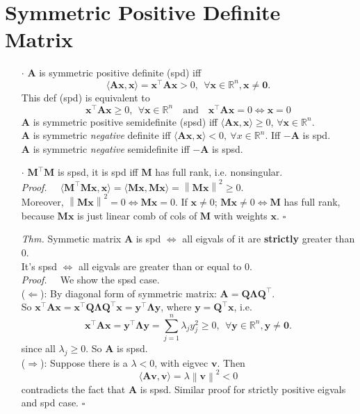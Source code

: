 \documentclass[a4paper, 11pt]{article}
\begin{document}
\section{Symmetric Positive Definite Matrix}
\begin{itemize}
	\item[$\cdot$] $\bm{A}$ is symmetric positive definite (spd) iff
	$$
	\langle \bm{Ax}, \bm{x} \rangle = \bm{x}^{\top} \bm{A}\bm{x} > 0,~~\forall \bm{x} \in \mathbb{R}^n, \bm{x}\ne \bm{0}.
	$$
	This def (spd) is equivalent to
	$$
	\bm{x}^{\top} \bm{Ax} \geq 0,~~\forall \bm{x}\in \mathbb{R}^n\text{~~~and~~~} \bm{x}^{\top} \bm{Ax} = 0 \iff \bm{x}=0
	$$
	$\bm{A}$ is symmetric positive semidefinite (spsd) iff $\langle \bm{Ax}, \bm{x} \rangle\geq 0$, $\forall \bm{x}\in \mathbb{R}^n$. \\
	$\bm{A}$ is symmetric \textit{negative} definite iff $\langle \bm{Ax},\bm{x} \rangle<0,~\forall x\in \mathbb{R}^n$. Iff $-\bm{A}$ is spd. \\
	$\bm{A}$ is symmetric \textit{negative} semidefinite iff $-\bm{A}$ is spsd.

	\item[$\cdot$] $\bm{M}^{\top} \bm{M}$ is spsd, it is spd iff $\bm{M}$ has full rank, i.e. nonsingular.\\
	\textit{Proof.~~} $\langle \bm{M}^{\top} \bm{Mx}, \bm{x} \rangle = \langle \bm{Mx}, \bm{Mx} \rangle = \left\|\bm{Mx}\right\|^2 \geq 0$.\\
	Moreover, $\left\|\bm{Mx}\right\|^2 = 0 \iff \bm{Mx}=0$. If $\bm{x}\ne 0$; $\bm{Mx}\ne 0 \iff \bm{M}$ has full rank, because $\bm{Mx}$ is just linear comb of cols of $\bm{M}$ with weights $\bm{x}$. $\square$
	\item[\textit{Thm.}] Symmetic matrix $\bm{A}$ is spd $\iff$ all eigvals of it are \textbf{strictly} greater than 0. \\
	It's spsd $\iff$ all eigvals are greater than or equal to 0. \\
	\textit{Proof.~~} We show the spsd case. \\
	($\Leftarrow$): By diagonal form of symmetric matrix: $\bm{A}=\bm{Q} \bm{\Lambda} \bm{Q}^{\top} $. \\
	So $\bm{x}^{\top} \bm{Ax} = \bm{x}^{\top}\bm{Q} \bm{\Lambda} \bm{Q}^{\top} \bm{x} = \bm{y}^{\top} \bm{\Lambda}\bm{y}$, where $\bm{y}=\bm{Q}^{\top}\bm{x}$, i.e.
	$$
	\bm{x}^{\top} \bm{Ax} = \bm{y}^{\top} \bm{\Lambda}\bm{y}=\sum_{j=1}^n \lambda_j y_j^2 \geq 0,~~\forall \bm{y}\in \mathbb{R}^n, \bm{y}\ne \bm{0}.
	$$
	since all $\lambda_j \geq 0$. So $\bm{A}$ is spsd. \\
	($\Rightarrow$): Suppose there is a $\lambda <0$, with eigvec $\bm{v}$. Then 
	$$
	\langle \bm{Av}, \bm{v}\rangle = \lambda \left\|\bm{v}\right\|^2 < 0
	$$
	contradicts the fact that $\bm{A}$ is spsd. Similar proof for strictly positive eigvals and spd case. $\square$


\end{itemize}
\end{document}
